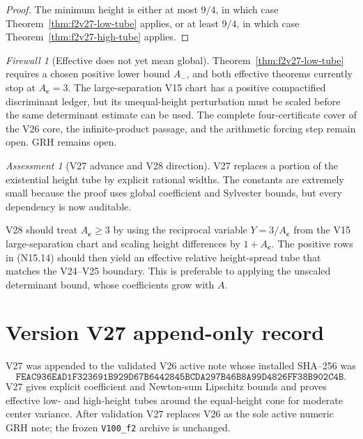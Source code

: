 \documentclass[11pt]{article}
\theoremstyle{definition}
\theoremstyle{remark}
\newtheorem{assessment}[theorem]{Assessment}
\newtheorem{firewall}[theorem]{Firewall}
\begin{document}
\begin{proof}
The minimum height is either at most \(9/4\), in which case
Theorem~\ref{thm:f2v27-low-tube} applies, or at least \(9/4\), in which
case Theorem~\ref{thm:f2v27-high-tube} applies.
\end{proof}

\begin{firewall}[Effective does not yet mean global]
\label{fire:f2v27}
Theorem~\ref{thm:f2v27-low-tube} requires a chosen positive lower bound
\(A_-\), and both effective theorems currently stop at \(A_{\bm c}=3\).
The large-separation V15 chart has a positive compactified discriminant
ledger, but its unequal-height perturbation must be scaled before the
same determinant estimate can be used.  The complete four-certificate
cover of the V26 core, the infinite-product passage, and the arithmetic
forcing step remain open.  GRH remains open.
\end{firewall}

\begin{assessment}[V27 advance and V28 direction]
\label{ass:f2v27}
V27 replaces a portion of the existential height tube by explicit
rational widths.  The constants are extremely small because the proof
uses global coefficient and Sylvester bounds, but every dependency is now
auditable.

V28 should treat \(A_{\bm c}\geq3\) by using the reciprocal variable
\(Y=3/A_{\bm c}\) from the V15 large-separation chart and scaling height
differences by \(1+A_{\bm c}\).  The positive rows in
\textup{(N15.14)} should then yield an effective relative height-spread
tube that matches the V24--V25 boundary.  This is preferable to applying
the unscaled determinant bound, whose coefficients grow with \(A\).
\end{assessment}

\section*{Version V27 append-only record}

V27 was appended to the validated V26 active note whose installed
SHA--256 was
\[
 \texttt{FEAC936EAD1F323691B929D67B6442845BCDA297B46B8A99D4826FF38B902C4B}.
 \tag{N27.36}
\]
V27 gives explicit coefficient and Newton-sum Lipschitz bounds and proves
effective low- and high-height tubes around the equal-height cone for
moderate center variance.  After validation V27 replaces V26 as the sole
active numeric GRH note; the frozen \texttt{V100\_f2} archive is unchanged.
\end{document}
